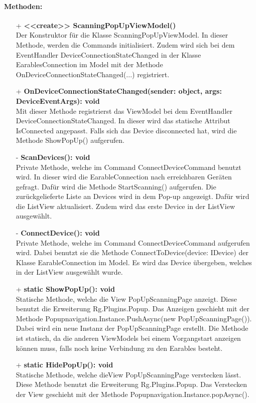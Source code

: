 \documentclass[a4paper,12pt]{article}
\begin{document}
	\paragraph{Methoden:}
	\begin{itemize}
		\item[+] \textbf{<<create>> ScanningPopUpViewModel()}\\Der Konstruktor für die Klasse ScanningPopUpViewModel. In dieser Methode, werden die Commands initialisiert. Zudem wird sich bei dem EventHandler DeviceConnectionStateChanged in der Klasse EarablesConnection im Model mit der Methode OnDeviceConnectionStateChanged(...) registriert.
		\item[+] \textbf{OnDeviceConnectionStateChanged(sender: object, args: DeviceEventArgs): void}\\Mit dieser Methode registrierst das ViewModel bei dem EventHandler DeviceConnectionStateChanged. In dieser wird das statische Attribut IsConnected angepasst. Falls sich das Device disconnected hat, wird die Methode ShowPopUp() aufgerufen.
		\item[-] \textbf{ScanDevices(): void}\\Private Methode, welche im Command ConnectDeviceCommand benutzt wird. In dieser wird die EarableConnection nach erreichbaren Geräten gefragt. Dafür wird die Methode StartScanning() aufgerufen. Die zurückgelieferte Liste an Devices wird in dem Pop-up angezeigt. Dafür wird die ListView aktualisiert. Zudem wird das erste Device in der ListView ausgewählt.
		\item[-] \textbf{ConnectDevice(): void}\\Private Methode, welche im Command ConnectDeviceCommand aufgerufen wird. Dabei benutzt sie die Methode ConnectToDevice(device: IDevice) der Klasse EarableConnection im Model. Es wird das Device übergeben, welches in der ListView ausgewählt wurde.
		\item[+] \textbf{static ShowPopUp(): void}\\Statische Methode, welche die View PopUpScanningPage anzeigt. Diese benutzt die Erweiterung \Gls{Rg.Plugins.Popup}. Das Anzeigen geschieht mit der Methode Popupnavigation.Instance.PushAsync(new PopUpScanningPage()). Dabei wird ein neue Instanz der PopUpScanningPage erstellt. Die Methode ist statisch, da die anderen ViewModels bei einem Vorgangstart anzeigen können muss, falls noch keine Verbindung zu den \gls{Earables} besteht.
		\item[+] \textbf{static HidePopUp(): void}\\Statische Methode, welche dieView PopUpScanningPage verstecken lässt. Diese Methode benutzt die Erweiterung \Gls{Rg.Plugins.Popup}. Das Verstecken der View geschieht mit der Methode Popupnavigation.Instance.popAsync(). 
	\end{itemize}
\end{document}
